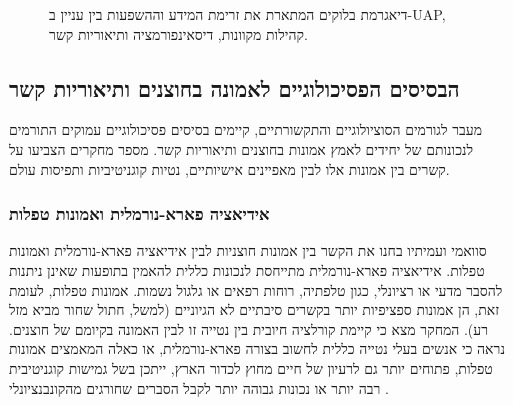 \documentclass[12pt,a4paper]{article}
\begin{document}
\begin{figure}[ht!]
    \centering
    \caption{דיאגרמת בלוקים המתארת את זרימת המידע וההשפעות בין עניין ב-UAP, קהילות מקוונות, דיסאינפורמציה ותיאוריות קשר.}
    \label{fig:conspiracy_flow}
\end{figure}

\subsection{הבסיסים הפסיכולוגיים לאמונה בחוצנים ותיאוריות קשר}
מעבר לגורמים הסוציולוגיים והתקשורתיים, קיימים בסיסים פסיכולוגיים עמוקים התורמים לנכונותם של יחידים לאמץ אמונות בחוצנים ותיאוריות קשר. מספר מחקרים הצביעו על קשרים בין אמונות אלו לבין מאפיינים אישיותיים, נטיות קוגניטיביות ותפיסות עולם.

\subsubsection{אידיאציה פארא-נורמלית ואמונות טפלות}
סוואמי ועמיתיו \cite{Swami2009} בחנו את הקשר בין אמונות חוצניות לבין אידיאציה פארא-נורמלית ואמונות טפלות. אידיאציה פארא-נורמלית מתייחסת לנכונות כללית להאמין בתופעות שאינן ניתנות להסבר מדעי או רציונלי, כגון טלפתיה, רוחות רפאים או גלגול נשמות. אמונות טפלות, לעומת זאת, הן אמונות ספציפיות יותר בקשרים סיבתיים לא הגיוניים (למשל, חתול שחור מביא מזל רע). המחקר מצא כי קיימת קורלציה חיובית בין נטייה זו לבין האמונה בקיומם של חוצנים. נראה כי אנשים בעלי נטייה כללית לחשוב בצורה פארא-נורמלית, או כאלה המאמצים אמונות טפלות, פתוחים יותר גם לרעיון של חיים מחוץ לכדור הארץ, ייתכן בשל גמישות קוגניטיבית רבה יותר או נכונות גבוהה יותר לקבל הסברים שחורגים מהקונבנציונלי \cite{Swami2009}.
\end{document}
